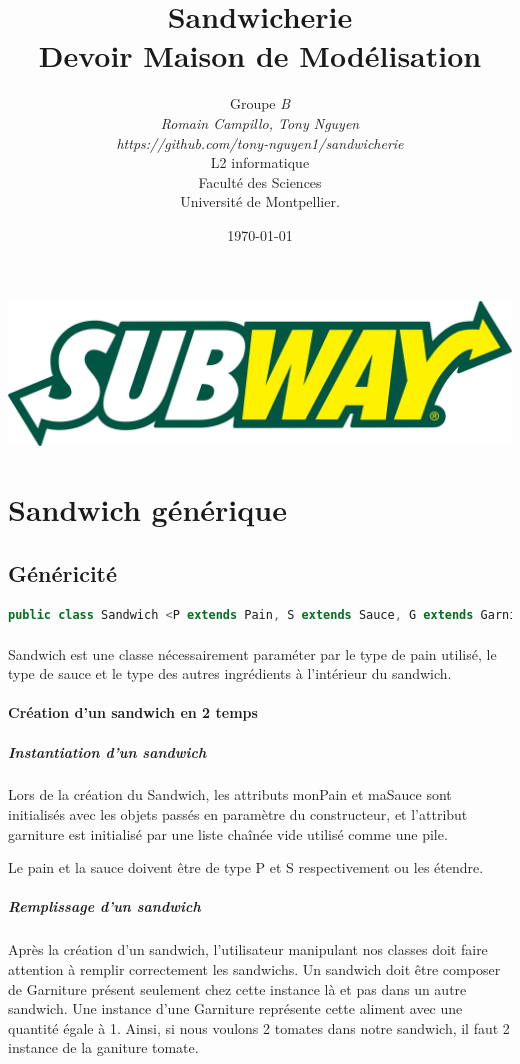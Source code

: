\documentclass[a4paper]{article}
\title{Sandwicherie\\         %
Devoir Maison de Modélisation}
\author{Groupe \emph{B}\\
  \emph{Romain Campillo, Tony Nguyen}\\
  \emph{https://github.com/tony-nguyen1/sandwicherie}\\
  L2 informatique\\
  Faculté des Sciences\\
Université de Montpellier.}
\date{\today}
\begin{document}
\maketitle
\begin{center}
    \includegraphics[scale=0.09]{./logo.png}
\end{center}
\newpage
\tableofcontents
\clearpage
\section{Sandwich générique}
\subsection{Généricité}

\begin{lstlisting}[language=Java, caption=Entête de class Sandwich]
    public class Sandwich <P extends Pain, S extends Sauce, G extends Garniture>
\end{lstlisting}
\paragraph{}
Sandwich est une classe nécessairement paraméter par le type de pain utilisé, le type de sauce et le type des autres ingrédients à l'intérieur du sandwich.

\paragraph{Création d'un sandwich en 2 temps}
\subparagraph{Instantiation d'un sandwich}
Lors de la création du Sandwich, les attributs monPain et maSauce sont initialisés avec les objets passés en paramètre du constructeur, et l’attribut garniture est initialisé par une liste chaînée vide utilisé comme une pile.

Le pain et la sauce doivent être de type P et S respectivement ou les étendre.

\subparagraph{Remplissage d'un sandwich}
Après la création d'un sandwich, l'utilisateur manipulant nos classes doit faire attention à remplir correctement les sandwichs. Un sandwich doit être composer de Garniture présent seulement chez cette instance là et pas dans un autre sandwich. Une instance d'une Garniture représente cette aliment avec une quantité égale à 1. Ainsi, si nous voulons 2 tomates dans notre sandwich, il faut 2 instance de la ganiture tomate.
\end{document}
